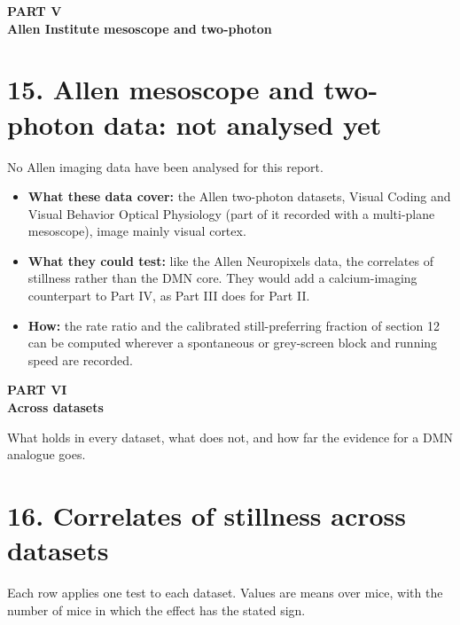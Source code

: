 \documentclass[10pt,a4paper]{article}
\begin{document}
\clearpage
{\small\bfseries\color{accent} PART V}\\[2pt]
{\LARGE\bfseries Allen Institute mesoscope and two-photon}\par\medskip

\section{15. Allen mesoscope and two-photon data: not analysed yet}
No Allen imaging data have been analysed for this report.

\begin{itemize}
\item \textbf{What these data cover:} the Allen two-photon datasets, Visual Coding and Visual Behavior Optical Physiology (part of it recorded with a multi-plane mesoscope), image mainly visual cortex.
\item \textbf{What they could test:} like the Allen Neuropixels data, the correlates of stillness rather than the DMN core. They would add a calcium-imaging counterpart to Part IV, as Part III does for Part II.
\item \textbf{How:} the rate ratio and the calibrated still-preferring fraction of section 12 can be computed wherever a spontaneous or grey-screen block and running speed are recorded.
\end{itemize}
\clearpage
{\small\bfseries\color{accent} PART VI}\\[2pt]
{\LARGE\bfseries Across datasets}\par\medskip

What holds in every dataset, what does not, and how far the evidence for a DMN analogue goes.

\section{16. Correlates of stillness across datasets}
Each row applies one test to each dataset. Values are means over mice, with the number of mice in which the effect has the stated sign.
\end{document}
